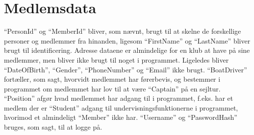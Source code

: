 \section{Medlemsdata}

``PersonId'' og ``MemberId'' bliver, som nævnt, brugt til at skelne de forskellige personer og medlemmer fra hinanden,
ligesom ``FirstName'' og ``LastName'' bliver brugt til identificering. Adresse dataene er almindelige for en klub at
have på sine medlemmer, men bliver ikke brugt til noget i programmet. Ligeledes bliver ``DateOfBirth'', ``Gender'',
``PhoneNumber'' og ``Email'' ikke brugt. ``BoatDriver'' fortæller, som sagt, hvorvidt medlemmet har førerbevis, og
bestemmer i programmet om medlemmet har lov til at være ``Captain'' på en sejltur. ``Position'' afgør hvad
medlemmet har adgang til i programmet, f.eks. har et medlem der er ``Student'' adgang til undervisningsfunktionerne i
programmet, hvorimod et almindeligt ``Member'' ikke har. ``Username'' og ``PasswordHash'' bruges, som sagt, til at logge
på.

